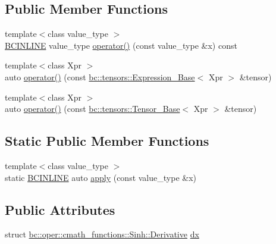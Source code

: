 \subsection*{Public Member Functions}
\begin{DoxyCompactItemize}
\item 
{\footnotesize template$<$class value\+\_\+type $>$ }\\\hyperlink{common_8h_a6699e8b0449da5c0fafb878e59c1d4b1}{B\+C\+I\+N\+L\+I\+NE} value\+\_\+type \hyperlink{structbc_1_1oper_1_1cmath__functions_1_1Sinh_aa37b1b580efe9077881120014793739d}{operator()} (const value\+\_\+type \&x) const
\item 
{\footnotesize template$<$class Xpr $>$ }\\auto \hyperlink{structbc_1_1oper_1_1cmath__functions_1_1Sinh_ad7b3c6850cbd3ec3817642edde48a032}{operator()} (const \hyperlink{classbc_1_1tensors_1_1Expression__Base}{bc\+::tensors\+::\+Expression\+\_\+\+Base}$<$ Xpr $>$ \&tensor)
\item 
{\footnotesize template$<$class Xpr $>$ }\\auto \hyperlink{structbc_1_1oper_1_1cmath__functions_1_1Sinh_aea0370cc5e2fd162c58148baa43d9dd2}{operator()} (const \hyperlink{classbc_1_1tensors_1_1Tensor__Base}{bc\+::tensors\+::\+Tensor\+\_\+\+Base}$<$ Xpr $>$ \&tensor)
\end{DoxyCompactItemize}
\subsection*{Static Public Member Functions}
\begin{DoxyCompactItemize}
\item 
{\footnotesize template$<$class value\+\_\+type $>$ }\\static \hyperlink{common_8h_a6699e8b0449da5c0fafb878e59c1d4b1}{B\+C\+I\+N\+L\+I\+NE} auto \hyperlink{structbc_1_1oper_1_1cmath__functions_1_1Sinh_afd724541590867210a845cc76f089f6a}{apply} (const value\+\_\+type \&x)
\end{DoxyCompactItemize}
\subsection*{Public Attributes}
\begin{DoxyCompactItemize}
\item 
struct \hyperlink{structbc_1_1oper_1_1cmath__functions_1_1Sinh_1_1Derivative}{bc\+::oper\+::cmath\+\_\+functions\+::\+Sinh\+::\+Derivative} \hyperlink{structbc_1_1oper_1_1cmath__functions_1_1Sinh_aeb8f9859983dff6f40fea974293f16e7}{dx}
\end{DoxyCompactItemize}


